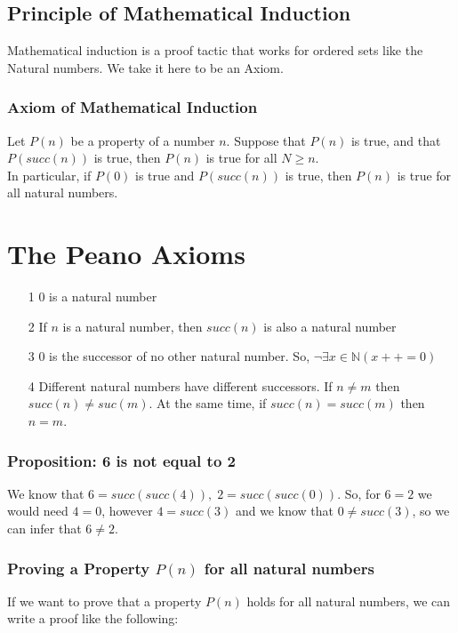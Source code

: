 \documentclass[]{scrbook}
\begin{document}
\subsection*{Principle of Mathematical Induction}
Mathematical induction is a proof tactic that works for ordered sets like the Natural numbers. We take it here to be an Axiom.

\subsubsection*{Axiom of Mathematical Induction}
Let $P(n)$ be a property of a number $n$. Suppose that $P(n)$ is true, and that $P(succ(n))$ is true, then $P(n)$ is true for all $N \geqslant n$.\\
In particular, if $P(0)$ is true and $P(succ(n))$ is true, then $P(n)$ is true for all natural numbers.


\section{The Peano Axioms}

\begin{itemize}
	\item[1] 0 is a natural number
	\item[2] If $n$ is a natural number, then $succ(n)$ is also a natural number
	\item[3] 0 is the successor of no other natural number. So, $\neg\exists x\in\mathbb{N}(x++ = 0)$
	\item[4] Different natural numbers have different successors. If $n \neq m$ then $succ(n) \neq suc(m)$. At the same time, if $succ(n) = succ(m)$ then $n = m$. 
\end{itemize}


\subsubsection*{Proposition: 6 is not equal to 2}
We know that $6 = succ(succ(4)),\; 2 = succ(succ(0)).$ So, for $ 6 = 2$ we would need $4 = 0$, however $4 = succ(3)$ and we know that $0 \neq succ(3)$, so we can infer that $6 \neq 2$.

\subsubsection*{Proving a Property $P(n)$ for all natural numbers}
If we want to prove that a property $P(n)$ holds for all natural numbers, we can write a proof like the following:
\end{document}
